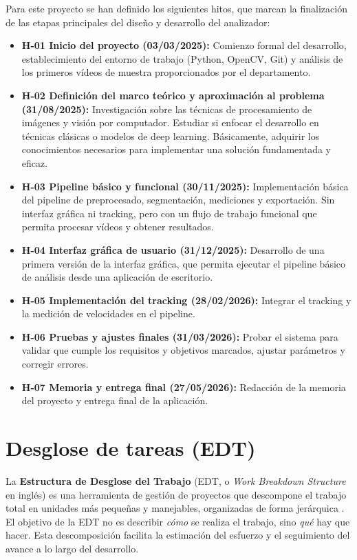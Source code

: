 Para este proyecto se han definido los siguientes hitos, que marcan la finalización de las etapas principales del diseño y desarrollo del analizador:

\begin{itemize}
    \item \textbf{H-01 Inicio del proyecto (03/03/2025):} Comienzo formal del desarrollo, establecimiento del entorno de trabajo (Python, OpenCV, Git) y análisis de los primeros vídeos de muestra proporcionados por el departamento.
    \item \textbf{H-02 Definición del marco teórico y aproximación al problema (31/08/2025):} Investigación sobre las técnicas de procesamiento de imágenes y visión por computador. Estudiar si enfocar el desarrollo en técnicas clásicas o modelos de deep learning. Básicamente, adquirir los conocimientos necesarios para implementar una solución fundamentada y eficaz.
    \item \textbf{H-03 Pipeline básico y funcional (30/11/2025):} Implementación básica del pipeline de preprocesado, segmentación, mediciones y exportación. Sin interfaz gráfica ni tracking, pero con un flujo de trabajo funcional que permita procesar vídeos y obtener resultados.
    \item \textbf{H-04 Interfaz gráfica de usuario (31/12/2025):} Desarrollo de una primera versión de la interfaz gráfica, que permita ejecutar el pipeline básico de análisis desde una aplicación de escritorio.
    \item \textbf{H-05 Implementación del tracking (28/02/2026):} Integrar el tracking y la medición de velocidades en el pipeline.
    \item \textbf{H-06 Pruebas y ajustes finales (31/03/2026):} Probar el sistema para validar que cumple los requisitos y objetivos marcados, ajustar parámetros y corregir errores.
    \item \textbf{H-07 Memoria y entrega final (27/05/2026):} Redacción de la memoria del proyecto y entrega final de la aplicación.
\end{itemize}

\section{Desglose de tareas (EDT)}

La \textbf{Estructura de Desglose del Trabajo} (EDT, o \textit{Work Breakdown Structure} en inglés) es una herramienta de gestión de proyectos que descompone el trabajo total en unidades más pequeñas y manejables, organizadas de forma jerárquica \cite{pressman2014}. El objetivo de la EDT no es describir \textit{cómo} se realiza el trabajo, sino \textit{qué} hay que hacer. Esta descomposición facilita la estimación del esfuerzo y el seguimiento del avance a lo largo del desarrollo.

